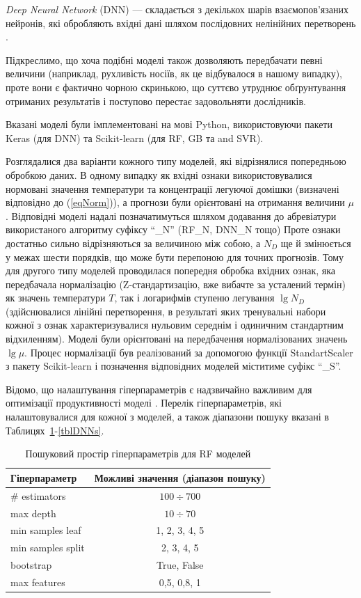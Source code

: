 \documentclass[12pt,a4paper,titlepage,oneside]{book}
\numberwithin{equation}{part}
\begin{document}
\noindent
\emph{Deep Neural Network} (DNN) --- складається з декількох шарів взаємопов'язаних нейронів, які обробляють вхідні дані
шляхом послідовних нелінійних перетворень \cite{Liu2023}.

Підкреслимо, що хоча подібні моделі також дозволяють передбачати певні величини (наприклад, рухливість носіїв,
як це відбувалося в нашому випадку), проте вони є фактично чорною скринькою, що суттєво утруднює обґрунтування отриманих результатів
і поступово перестає задовольняти дослідників.


Вказані моделі були імплементовані на мові Python,
використовуючи пакети Keras (для DNN) та Scikit-learn (для RF, GB та and SVR).

Розглядалися два варіанти кожного типу моделей, які відрізнялися попередньою обробкою даних.
В одному випадку як вхідні ознаки використовувалися нормовані значення температури та концентрації легуючої домішки
(визначені відповідно до (\ref{eqNorm})), а прогнози були орієнтовані на отримання величини $\mu$.
Відповідні моделі надалі позначатимуться шляхом додавання до абревіатури використаного алгоритму суфіксу ``\_N'' (RF\_N, DNN\_N тощо)
Проте ознаки достатньо сильно відрізняються за величиною між собою, а $N_D$ ще й змінюється у межах шести порядків,
що може бути перепоною для точних прогнозів.
Тому для другого типу моделей проводилася попередня обробка вхідних ознак, яка передбачала нормалізацію (Z-стандартизацію, вже вибачте за усталений термін)
як значень температури $T$,
так і логарифмів ступеню легування $\lg N_D$
(здійснювалися лінійні перетворення, в результаті яких тренувальні набори кожної з ознак характеризувалися нульовим середнім і одиничним стандартним відхиленням).
Моделі були орієнтовані на передбачення нормалізованих значень $\lg \mu$.
Процес нормалізації був реалізований за допомогою функції StandartScaler з пакету Scikit-learn і позначення відповідних моделей міститиме суфікс ``\_S''.

Відомо, що налаштування гіперпараметрів  є надзвичайно важливим для оптимізації продуктивності моделі \cite{Hanif2024}.
Перелік гіперпараметрів, які налаштовувалися для кожної з моделей, а також діапазони пошуку вказані в Таблицях~\ref{tblRFs}-\ref{tblDNNs}.


\begin{table}
\caption{Пошуковий простір гіперпараметрів для RF моделей }
\label{tblRFs}
\centering
\begin{tabular}{|l|c|}
\hline
Гіперпараметр&Можливі значення (діапазон пошуку)\\
\hline
\# estimators&	$100\div700$\\
\hline
max depth&	$10\div70$\\
\hline
min samples leaf &	1, 2, 3, 4, 5\\
\hline
min samples split	&2, 3, 4, 5\\
\hline
bootstrap	& True, False \\
\hline
max features &	0,5, 0,8, 1\\
\hline
\end{tabular}
\end{table}
\end{document}
